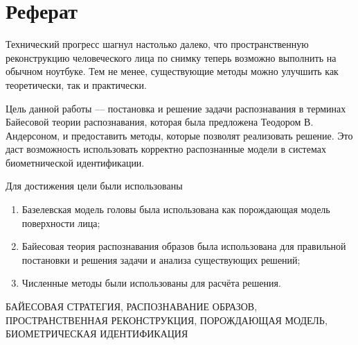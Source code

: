 \chapter*{Реферат}

Технический прогресс шагнул настолько далеко,
что пространственную реконструкцию человеческого лица по снимку
теперь возможно выполнить на обычном ноутбуке.
Тем не менее,
существующие методы можно улучшить как теоретически, так и практически.

Цель данной работы --- постановка и решение задачи распознавания
в терминах Байесовой теории распознавания,
которая была предложена Теодором В. Андерсоном,
и предоставить методы, которые позволят реализовать решение.
Это даст возможность использовать корректно распознанные модели
в системах биометнической идентификации.

Для достижения цели были использованы
\begin{enumerate}
  \item
    Базелевская модель головы была использована
    как порождающая модель поверхности лица;
  \item
    Байесовая теория распознавания образов была использована
    для правильной постановки и решения задачи и анализа существующих решений;
  \item
    Численные методы были использованы для расчёта решения.
\end{enumerate}

\MakeUppercase{Байесовая стратегия, распознавание образов,
пространственная реконструкция, порождающая модель,
биометрическая идентификация}
